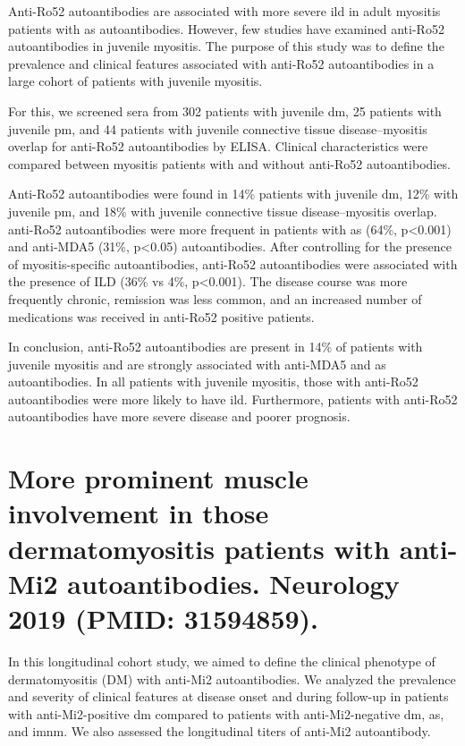 Anti-Ro52 autoantibodies are associated with more severe \gls{ild} in adult myositis patients with \gls{as} autoantibodies. However, few studies have examined anti-Ro52 autoantibodies in juvenile myositis. The purpose of this study was to define the prevalence and clinical features associated with anti-Ro52 autoantibodies in a large cohort of patients with juvenile myositis.

For this, we screened sera from 302 patients with juvenile \gls{dm}, 25 patients with juvenile \gls{pm}, and 44 patients with
juvenile connective tissue disease–myositis overlap for anti-Ro52 autoantibodies by ELISA. Clinical characteristics were compared between myositis patients with and without anti-Ro52 autoantibodies.

Anti-Ro52 autoantibodies were found in 14\% patients with juvenile \gls{dm}, 12\% with juvenile \gls{pm}, and 18\% with juvenile connective tissue disease–myositis overlap. anti-Ro52 autoantibodies were more frequent in patients with \gls{as} (64\%, p<0.001) and anti-MDA5 (31\%, p<0.05) autoantibodies. After controlling for the presence of myositis-specific autoantibodies, anti-Ro52 autoantibodies were associated with the presence of ILD (36\% vs 4\%, p<0.001). The disease course was more frequently chronic, remission was less common, and an increased number of medications was received in anti-Ro52 positive patients.

In conclusion, anti-Ro52 autoantibodies are present in 14\% of patients with juvenile myositis and are strongly associated with anti-MDA5 and \gls{as} autoantibodies. In all patients with juvenile myositis, those with anti-Ro52 autoantibodies were more likely to have \gls{ild}. Furthermore, patients with anti-Ro52 autoantibodies have more severe disease and poorer prognosis.


{\cleardoublepage}

\section{More prominent muscle involvement in those dermatomyositis patients with anti-Mi2 autoantibodies. Neurology 2019 (PMID: 31594859).}
\label{sec:mi2_clinical}

In this longitudinal cohort study, we aimed to define the clinical phenotype of dermatomyositis (DM) with anti-Mi2 autoantibodies. We analyzed the prevalence and severity of clinical features at disease onset and during follow-up in patients with anti-Mi2-positive \gls{dm} compared to patients with anti-Mi2-negative \gls{dm}, \gls{as}, and \gls{imnm}. We also assessed the longitudinal titers of anti-Mi2 autoantibody.

